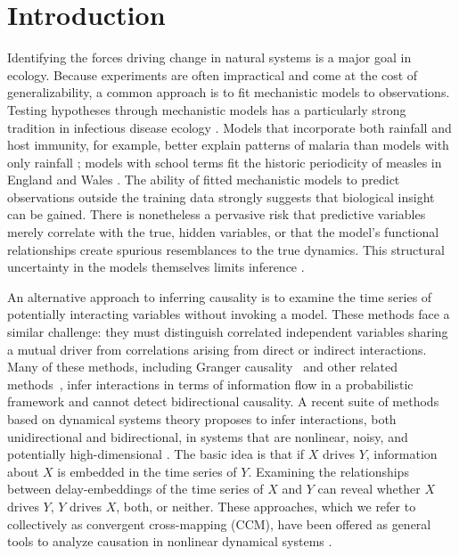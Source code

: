 \documentclass[10pt,letterpaper]{article}
\begin{document}
\linenumbers

\section*{Introduction}

Identifying the forces driving change in natural systems is a major goal in ecology. 
Because experiments are often impractical and come at the cost of generalizability, a common approach is to fit mechanistic models to observations. 
Testing hypotheses through mechanistic models has a particularly strong tradition in infectious disease ecology \cite{KeelingRohani, AndersonMay, Kermack1927, Ross1910}.
Models that incorporate both rainfall and host immunity, for example, better explain patterns of malaria than models with only rainfall \cite{Laneri2010}; models with school terms fit the historic periodicity of measles in England and Wales \cite{Finkenstadt2000, Fine1982}.
The ability of fitted mechanistic models to predict observations outside the training data strongly suggests that biological insight can be gained. There is nonetheless a pervasive risk that predictive variables merely correlate with the true, hidden variables, or that the model's functional relationships create spurious resemblances to the true dynamics. 
This structural uncertainty in the models themselves limits inference \cite{BurnhamAnderson, He2009, Yodzis1988, Wood1999, Grad2012}. 

An alternative approach to inferring causality is to examine the time series of potentially interacting variables without invoking a model. 
These methods face a similar challenge: they must distinguish correlated independent variables sharing a mutual driver from correlations arising from direct or indirect interactions. 
Many of these methods, including Granger causality~\cite{Granger1969} and other related methods~\cite{Schumacher2015,Mooij2014,Stegle2010}, infer interactions in terms of information flow in a probabilistic framework and cannot detect bidirectional causality.
A recent suite of methods based on dynamical systems theory proposes to infer interactions, both unidirectional and bidirectional, in systems that are nonlinear, noisy, and potentially high-dimensional \cite{Sugihara2012, Ye2015, Clark2015}.
The basic idea is that if $X$ drives $Y$, information about $X$ is embedded in the time series of $Y$.
Examining the relationships between delay-embeddings of the time series of $X$ and $Y$ can reveal whether $X$ drives $Y$, $Y$ drives $X$, both, or neither.
These approaches, which we refer to collectively as convergent cross-mapping (CCM), have been offered as general tools to analyze causation in nonlinear dynamical systems \cite{Sugihara2012, Ye2015, Clark2015, Deyle2016b}.
\end{document}

